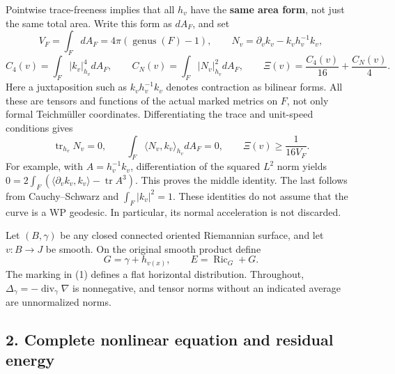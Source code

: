 \documentclass[
  11pt,
]{article}
\begin{document}
Pointwise trace-freeness implies that all \(h_v\) have the \textbf{same
area form}, not just the same total area. Write this form as \(dA_F\),
and set \[
 V_F=\int_FdA_F=4\pi(\operatorname{genus}(F)-1),\qquad
 N_v=\partial_vk_v-k_vh_v^{-1}k_v,
\] \[
 C_4(v)=\int_F|k_v|_{h_v}^4dA_F,\qquad
 C_N(v)=\int_F|N_v|_{h_v}^2dA_F,\qquad
 \Xi(v)=\frac{C_4(v)}{16}+\frac{C_N(v)}4.
 \tag{2}
\] Here a juxtaposition such as \(k_vh_v^{-1}k_v\) denotes contraction
as bilinear forms. All these are tensors and functions of the actual
marked metrics on \(F\), not only formal Teichmüller coordinates.
Differentiating the trace and unit-speed conditions gives \[
 \operatorname{tr}_{h_v}N_v=0,\qquad
 \int_F\langle N_v,k_v\rangle_{h_v}dA_F=0,
 \qquad \Xi(v)\ge\frac1{16V_F}.
 \tag{3}
\] For example, with \(A=h_v^{-1}k_v\), differentiation of the squared
\(L^2\) norm yields
\(0=2\int_F(\langle\partial_vk_v,k_v\rangle-\operatorname{tr}A^3)\).
This proves the middle identity. The last follows from Cauchy--Schwarz
and \(\int_F|k_v|^2=1\). These identities do not assume that the curve
is a WP geodesic. In particular, its normal acceleration is not
discarded.

Let \((B,\gamma)\) be any closed connected oriented Riemannian surface,
and let \(v:B\to J\) be smooth. On the original smooth product define \[
             G=\gamma+h_{v(x)},\qquad E=\operatorname{Ric}_G+G.
 \tag{4}
\] The marking in (1) defines a flat horizontal distribution.
Throughout, \(\Delta_\gamma=-\operatorname{div}_\gamma\nabla\) is
nonnegative, and tensor norms without an indicated average are
unnormalized norms.

\hypertarget{complete-nonlinear-equation-and-residual-energy}{%
\subsection{2. Complete nonlinear equation and residual
energy}\label{complete-nonlinear-equation-and-residual-energy}}
\end{document}
